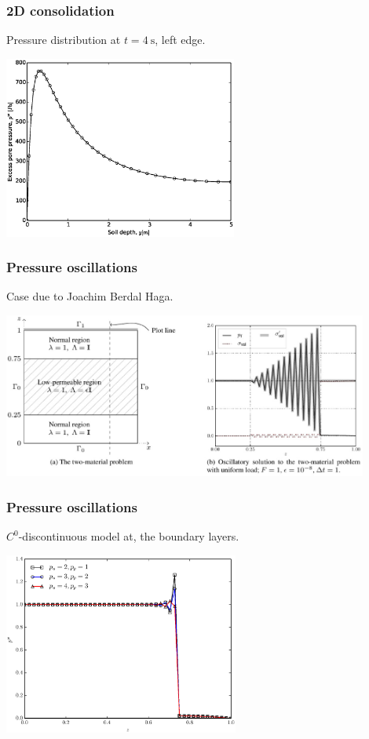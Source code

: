 \documentclass{beamer}
\begin{document}
\begin{frame}
  \frametitle{2D consolidation}

  Pressure distribution at $t = \SI{4}{\second}$, left edge.
  \begin{center}
    \includegraphics[height=6cm]{figs/OGS2DExcessPorePrProf}
  \end{center}
\end{frame}

\begin{frame}
  \frametitle{Pressure oscillations}

  Case due to Joachim Berdal Haga.
  \begin{center}
    \includegraphics[width=12cm]{figs/PressureOscillationsProblem}
  \end{center}
\end{frame}

\begin{frame}
  \frametitle{Pressure oscillations}

  $C^0$-discontinuous model at, the boundary layers.
  \begin{center}
    \includegraphics[height=6cm]{figs/LowPermLayer_pw-z_plot7}
  \end{center}
\end{frame}
\end{document}
